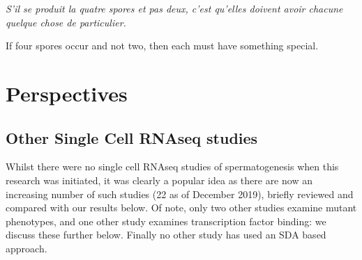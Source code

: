 \begin{savequote}[8cm]
\textit{S'il se produit la quatre spores et pas deux, c'est qu'elles doivent avoir chacune quelque chose de particulier.}

If four spores occur and not two, then each must have something special.
\end{savequote}

\chapter{\label{ch:4-discuss}Perspectives}

\minitoc


\section{Other Single Cell RNAseq studies}
Whilst there were no single cell RNAseq studies of spermatogenesis when this research was initiated, it was clearly a popular idea as there are now an increasing number of such studies (22 as of December 2019), briefly reviewed and compared with our results below.
Of note, only two other studies examine mutant phenotypes, and one other study examines transcription factor binding: we discuss these further below.
Finally no other study has used an SDA based approach.


